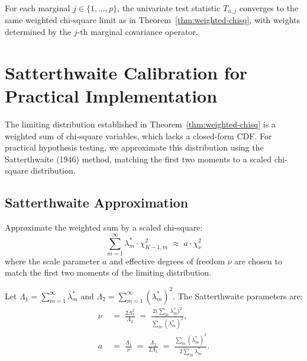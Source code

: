 \begin{corollary}
For each marginal $j \in \{1, \ldots, p\}$, the univariate test statistic $T_{n,j}$ converges to the same weighted chi-square limit as in Theorem~\ref{thm:weighted-chisq}, with weights determined by the $j$-th marginal covariance operator.
\end{corollary}



\section{Satterthwaite Calibration for Practical Implementation}
\label{sec:satterthwaite}

The limiting distribution established in Theorem~\ref{thm:weighted-chisq} is a weighted sum of chi-square variables, which lacks a closed-form CDF. For practical hypothesis testing, we approximate this distribution using the Satterthwaite (1946) method, matching the first two moments to a scaled chi-square distribution.

\subsection{Satterthwaite Approximation}

Approximate the weighted sum by a scaled chi-square:
\begin{equation}\label{eq:satterthwaite-approx}
\sum_{m=1}^{\infty} \lambda_m^* \cdot \chi^2_{K-1,m}
\;\approx\; a \cdot \chi^2_{\nu}
\end{equation}
where the scale parameter $a$ and effective degrees of freedom $\nu$ are chosen to match the first two moments of the limiting distribution.

\begin{proposition}\label{prop:satterthwaite}
Let $\Lambda_1 = \sum_{m=1}^{\infty} \lambda_m^*$ and $\Lambda_2 = \sum_{m=1}^{\infty} (\lambda_m^*)^2$. The Satterthwaite parameters are:
\begin{align}
\nu \;&=\; \frac{2\Lambda_1^2}{\Lambda_2} \;=\; \frac{2\big(\sum_{m} \lambda_m^*\big)^2}{\sum_{m} (\lambda_m^*)^2}, \label{eq:nu-eff}\\[6pt]
a \;&=\; \frac{\Lambda_1}{\nu} \;=\; \frac{\Lambda_2}{2\Lambda_1} \;=\; \frac{\sum_{m} (\lambda_m^*)^2}{2\sum_{m} \lambda_m^*}. \label{eq:scale-a}
\end{align}
\end{proposition}

